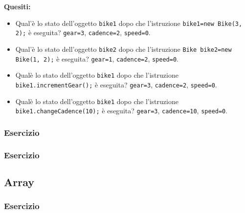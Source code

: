 \documentclass{article}
\theoremstyle{definition}
\begin{document}





\textbf{Quesiti:}\\
\begin{itemize}
\item Qual'\`e lo stato dell'oggetto \texttt{bike1} dopo che l'istruzione   \texttt{bike1=new Bike(3, 2);} \`e eseguita? 
\texttt{gear=3}, \texttt{cadence=2}, \texttt{speed=0}.
\item Qual'\`e lo stato dell'oggetto  \texttt{bike2} dopo che l'istruzione  \texttt{Bike bike2=new Bike(1, 2);} \`e eseguita? 
\texttt{gear=1}, \texttt{cadence=2}, \texttt{speed=0}.
\item Qual\`e lo stato dell'oggetto \texttt{bike1} dopo che l'istruzione \texttt{bike1.incrementGear();} \`e eseguita? 
\texttt{gear=3}, \texttt{cadence=2}, \texttt{speed=0}.
\item Qual\`e lo stato dell'oggetto \texttt{bike1} dopo che l'istruzione   \texttt{bike1.changeCadence(10);} \`e eseguita? 
\texttt{gear=3}, \texttt{cadence=10}, \texttt{speed=0}.
\end{itemize}

\subsubsection{Esercizio}




\subsubsection{Esercizio}





\subsection{Array}
\subsubsection{Esercizio}
\end{document}
